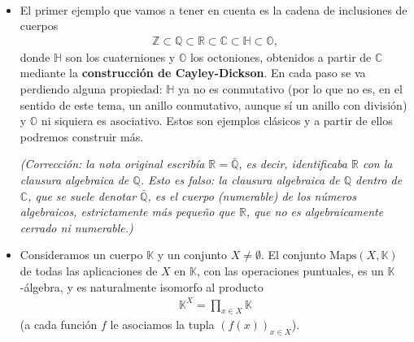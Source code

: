 \begin{ejemplo}\
    \begin{itemize}
        \item El primer ejemplo que vamos a tener en cuenta es la cadena de inclusiones de cuerpos
        \begin{gather*}
            \mathbb{Z}\subset \mathbb{Q} \subset \mathbb{R} \subset \mathbb{C} \subset \mathbb{H} \subset \mathbb{O},
        \end{gather*}
        donde $\mathbb{H}$ son los cuaterniones y $\mathbb{O}$ los octoniones, obtenidos a partir de $\mathbb{C}$ mediante la \textbf{construcción de Cayley-Dickson}. En cada paso se va perdiendo alguna propiedad: $\mathbb{H}$ ya no es conmutativo (por lo que no es, en el sentido de este tema, un anillo conmutativo, aunque sí un anillo con división) y $\mathbb{O}$ ni siquiera es asociativo. Estos son ejemplos clásicos y a partir de ellos podremos construir más.

        \emph{(Corrección: la nota original escribía $\mathbb{R}=\bar{\mathbb{Q}}$, es decir, identificaba $\mathbb{R}$ con la clausura algebraica de $\mathbb{Q}$. Esto es falso: la clausura algebraica de $\mathbb{Q}$ dentro de $\mathbb{C}$, que se suele denotar $\bar{\mathbb{Q}}$, es el cuerpo (numerable) de los números algebraicos, estrictamente más pequeño que $\mathbb{R}$, que no es algebraicamente cerrado ni numerable.)}

        \item Consideramos un cuerpo $\mathbb{K}$ y un conjunto $X\neq \emptyset$. El conjunto $\mathrm{Maps}(X,\mathbb{K})$ de todas las aplicaciones de $X$ en $\mathbb{K}$, con las operaciones puntuales, es un $\mathbb{K}$-álgebra, y es naturalmente isomorfo al producto
        \begin{gather*}
            \mathbb{K}^X = \prod_{x\in X} \mathbb{K}
        \end{gather*}
        (a cada función $f$ le asociamos la tupla $(f(x))_{x\in X}$).


\end{itemize}
\end{ejemplo}
